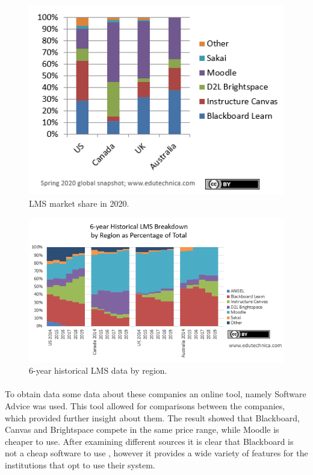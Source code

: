 \documentclass[]{article}
\begin{document}
\begin{figure}
    \centering
    \includegraphics[width =\linewidth]{lms-vle-2020.png}
    \caption{LMS market share in 2020. \cite{VLE-2020-IMG}}
    \label{fig:LMS-2020}
\end{figure}

\begin{figure}
    \centering
    \includegraphics[width =1.2\linewidth]{lms-vle-2020-y5.png}
    \caption{6-year historical LMS data by region. \cite{VLE-2020-IMG}}
    \label{fig:LMS-2020-6-year}
\end{figure}

\paragraph{}
To obtain data some data about these companies an online tool, namely Software Advice \cite{Software-Advice} was used. This tool allowed for comparisons between the companies, which provided further insight about them. The result showed that Blackboard, Canvas and Brightspace compete in the same price range, while Moodle is cheaper to use. After examining different sources it is clear that Blackboard is not a cheap software to use \cite{Blackboard-v-Moodle}, however it provides a wide variety of features for the institutions that opt to use their system.
\end{document}
